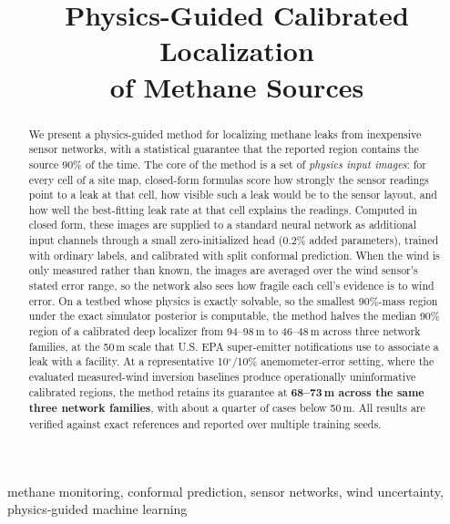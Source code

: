 \documentclass[conference]{IEEEtran}
\begin{document}
\title{Physics-Guided Calibrated Localization\\ of Methane Sources}

\author{}

\maketitle

\begin{abstract}
We present a physics-guided method for localizing methane leaks from
inexpensive sensor networks, with a statistical guarantee that the
reported region contains the source 90\% of the time. The core of the
method is a set of \emph{physics input images}: for every cell of a site
map, closed-form formulas score how strongly the sensor readings point to
a leak at that cell, how visible such a leak would be to the sensor
layout, and how well the best-fitting leak rate at that cell explains the
readings. Computed in closed form, these images are supplied to a
standard neural network as additional input channels through a small
zero-initialized head (0.2\% added parameters), trained with ordinary
labels, and calibrated with split conformal prediction. When the wind is
only measured rather than known, the images are averaged over the wind
sensor's stated error range, so the network also sees how fragile each
cell's evidence is to wind error. On a testbed whose physics is exactly
solvable, so the smallest 90\%-mass region under the exact simulator
posterior is computable, the method halves the median 90\% region of a
calibrated deep localizer from 94--98\,m to 46--48\,m across three
network families, at the 50\,m scale that U.S. EPA super-emitter
notifications use to associate a leak with a facility. At a
representative 10$^\circ$/10\% anemometer-error setting, where the
evaluated measured-wind inversion baselines produce operationally
uninformative calibrated regions, the method retains its guarantee at
\textbf{68--73\,m across the same three network families}, with about
a quarter of cases below 50\,m. All results are
verified against exact references and reported over multiple training
seeds.
\end{abstract}

\begin{IEEEkeywords}
methane monitoring, conformal prediction, sensor networks, wind
uncertainty, physics-guided machine learning
\end{IEEEkeywords}
\end{document}
